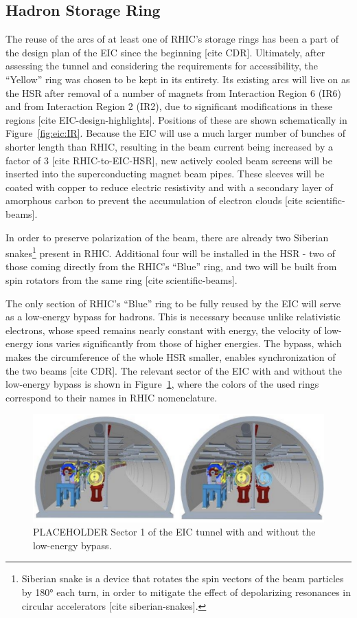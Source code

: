 \subsection{Hadron Storage Ring}
The reuse of the arcs of at least one of RHIC's storage rings has been a part of the design plan of the EIC since the beginning [cite CDR]. Ultimately, after assessing the tunnel and considering the requirements for accessibility, the “Yellow” ring was chosen to be kept in its entirety. Its existing arcs will live on as the HSR after removal of a number of magnets from Interaction Region 6 (IR6) and from Interaction Region 2 (IR2), due to significant modifications in these regions [cite EIC-design-highlights]. Positions of these are shown schematically in Figure~\ref{fig:eic:IR}. Because the EIC will use a much larger number of bunches of shorter length than RHIC, resulting in the beam current being increased by a factor of 3 [cite RHIC-to-EIC-HSR], new actively cooled beam screens will be inserted into the superconducting magnet beam pipes. These sleeves will be coated with copper to reduce electric resistivity and with a secondary layer of amorphous carbon to prevent the accumulation of electron clouds [cite scientific-beams]. 

In order to preserve polarization of the beam, there are already two Siberian snakes\footnote{Siberian snake is a device that rotates the spin vectors of the beam particles by \ang{180} each turn, in order to mitigate the effect of depolarizing resonances in circular accelerators [cite siberian-snakes].} present in RHIC. Additional four will be installed in the HSR - two of those coming directly from the RHIC's \enquote{Blue} ring, and two will be built from spin rotators from the same ring [cite scientific-beams].

The only section of RHIC's \enquote{Blue} ring to be fully reused by the EIC will serve as a low-energy bypass for hadrons. This is necessary because unlike relativistic electrons, whose speed remains nearly constant with energy, the velocity of low-energy ions varies significantly from those of higher energies. The bypass, which makes the circumference of the whole HSR smaller, enables synchronization of the two beams [cite CDR]. The relevant sector of the EIC with and without the low-energy bypass is shown in Figure~\ref{fig:eic:tunnel}, where the colors of the used rings correspond to their names in RHIC nomenclature.

\begin{figure}[ht]
    \centering
    \includegraphics[width=.9\linewidth]{img/tunnel.png}
    \caption{PLACEHOLDER Sector 1 of the EIC tunnel with and without the low-energy bypass.}
    \label{fig:eic:tunnel}
\end{figure}

